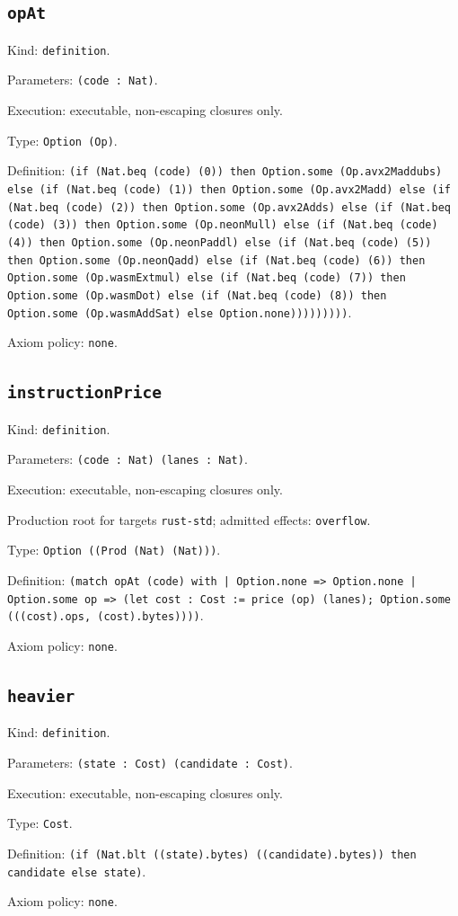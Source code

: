 \documentclass[11pt]{article}
\begin{document}
\subsection*{\texttt{opAt}}
\noindent Kind: \texttt{definition}.\par
\noindent Parameters: \texttt{(code : Nat)}.\par
\noindent Execution: executable, non-escaping closures only.\par
\noindent Type: \texttt{Option (Op)}.\par
\noindent Definition: \texttt{(if (Nat.beq (code) (0)) then Option.some (Op.avx2Maddubs) else (if (Nat.beq (code) (1)) then Option.some (Op.avx2Madd) else (if (Nat.beq (code) (2)) then Option.some (Op.avx2Adds) else (if (Nat.beq (code) (3)) then Option.some (Op.neonMull) else (if (Nat.beq (code) (4)) then Option.some (Op.neonPaddl) else (if (Nat.beq (code) (5)) then Option.some (Op.neonQadd) else (if (Nat.beq (code) (6)) then Option.some (Op.wasmExtmul) else (if (Nat.beq (code) (7)) then Option.some (Op.wasmDot) else (if (Nat.beq (code) (8)) then Option.some (Op.wasmAddSat) else Option.none)))))))))}.\par
\noindent Axiom policy: \texttt{none}.\par
\subsection*{\texttt{instructionPrice}}
\noindent Kind: \texttt{definition}.\par
\noindent Parameters: \texttt{(code : Nat) (lanes : Nat)}.\par
\noindent Execution: executable, non-escaping closures only.\par
\noindent Production root for targets \texttt{rust-std}; admitted effects: \texttt{overflow}.\par
\noindent Type: \texttt{Option ((Prod (Nat) (Nat)))}.\par
\noindent Definition: \texttt{(match opAt (code) with | Option.none => Option.none | Option.some op => (let cost : Cost := price (op) (lanes); Option.some (((cost).ops, (cost).bytes))))}.\par
\noindent Axiom policy: \texttt{none}.\par
\subsection*{\texttt{heavier}}
\noindent Kind: \texttt{definition}.\par
\noindent Parameters: \texttt{(state : Cost) (candidate : Cost)}.\par
\noindent Execution: executable, non-escaping closures only.\par
\noindent Type: \texttt{Cost}.\par
\noindent Definition: \texttt{(if (Nat.blt ((state).bytes) ((candidate).bytes)) then candidate else state)}.\par
\noindent Axiom policy: \texttt{none}.\par
\end{document}

